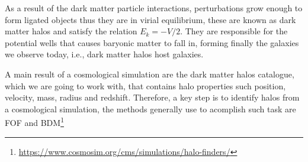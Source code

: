As a result of the dark matter particle interactions, perturbations 
grow enough to form ligated objects thus they are in virial equilibrium,
these are known as dark matter halos and satisfy the relation $E_k=-V/2$. 
They are responsible for the potential wells that causes baryonic matter 
to fall in, forming finally the galaxies we observe today, i.e., dark
matter halos host galaxies. 

A main result of a cosmological simulation are the dark matter halos 
catalogue, which we are going to work with, that contains halo properties such
position, velocity, mass, radius and redshift. Therefore, a key step is to identify 
halos from a cosmological simulation, the methods generally use to acomplish such 
task are FOF and BDM\footnote{\url{https://www.cosmosim.org/cms/simulations/halo-finders/}}

